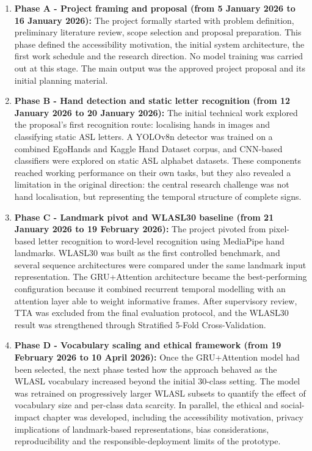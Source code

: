 \begin{enumerate}
    \item \textbf{Phase A - Project framing and proposal (from 5 January 2026 to 16 January 2026):} The
          project formally started with problem definition, preliminary literature review, scope
          selection and proposal preparation. This phase defined the accessibility motivation, the
          initial system architecture, the first work schedule and the research direction. No model
          training was carried out at this stage. The main output was the approved project proposal
          and its initial planning material.

    \item \textbf{Phase B - Hand detection and static letter recognition (from 12 January 2026 to 20 January 2026):}
          The initial technical work explored the proposal's first recognition route: localising
          hands in images and classifying static ASL letters. A YOLOv8n detector was trained on a
          combined EgoHands and Kaggle Hand Dataset corpus, and CNN-based classifiers were explored
          on static ASL alphabet datasets. These components reached working performance on their own
          tasks, but they also revealed a limitation in the original direction: the central research
          challenge was not hand localisation, but representing the temporal structure of complete
          signs.

    \item \textbf{Phase C - Landmark pivot and WLASL30 baseline (from 21 January 2026 to 19 February 2026):}
          The project pivoted from pixel-based letter recognition to word-level recognition using
          MediaPipe hand landmarks. WLASL30 was built as the first controlled benchmark, and several
          sequence architectures were compared under the same landmark input representation. The
          GRU+Attention architecture became the best-performing configuration because it combined
          recurrent temporal modelling with an attention layer able to weight informative frames.
          After supervisory review, TTA was excluded from the final evaluation protocol, and the
          WLASL30 result was strengthened through Stratified 5-Fold Cross-Validation.

    \item \textbf{Phase D - Vocabulary scaling and ethical framework (from 19 February 2026 to 10 April 2026):}
          Once the GRU+Attention model had been selected, the next phase tested how the approach
          behaved as the WLASL vocabulary increased beyond the initial 30-class setting. The model
          was retrained on progressively larger WLASL subsets to quantify the effect of vocabulary
          size and per-class data scarcity. In parallel, the ethical and social-impact chapter was
          developed, including the accessibility motivation, privacy implications of landmark-based
          representations, bias considerations, reproducibility and the responsible-deployment
          limits of the prototype.


\end{enumerate}
